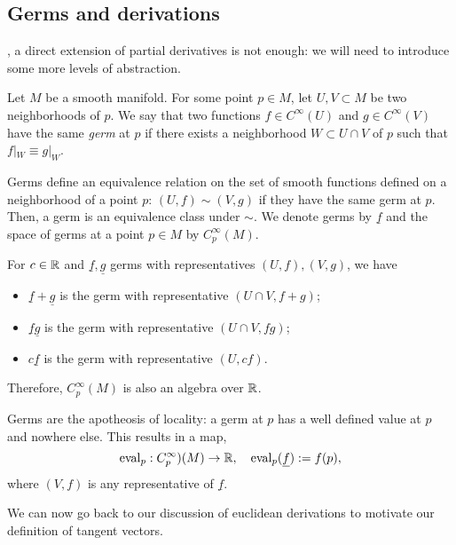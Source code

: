 \subsection{Germs and derivations}

, a direct extension of partial derivatives is not enough: we will need to introduce some more levels of abstraction.

\begin{defn}
    Let $M$ be a smooth manifold.
    For some point $p\in M$, let $U,V\subset M$ be two neighborhoods of $p$.
    We say that two functions $f\in C^\infty(U)$ and $g\in C^\infty(V)$ have the same \emph{germ} at $p$ if there exists a neighborhood $W\subset U\cap V$ of $p$ such that $f|_W \equiv g|_W$.
\end{defn}

Germs define an equivalence relation on the set of smooth functions defined on a neighborhood of a point $p$: $(U, f) \sim (V, g)$ if they have the same germ at $p$. Then, a germ is an equivalence class under $\sim$. We denote germs by $\underline f$ and the space of germs at a point $p\in M$ by $C_p^\infty(M)$.

For $c\in\mathbb{R}$ and $\underline f, \underline g$ germs with representatives $(U, f), (V, g)$, we have
\begin{itemize}
    \item $\underline f + \underline g$ is the germ with representative $(U\cap V, f+g)$;
    \item $\underline f \underline g$ is the germ with representative $(U\cap V, f g)$;
    \item $c\underline f$ is the germ with representative $(U, cf)$.
\end{itemize}
Therefore, $C_p^\infty(M)$ is also an algebra over $\mathbb{R}$.

Germs are the apotheosis of locality: a germ at $p$ has a well defined value at $p$ and nowhere else.
This results in a map,
\begin{equation}
    \operatorname{eval}_p: C_p^\infty)(M) \to \mathbb{R}, \quad
    \operatorname{eval}_p(\underline f) := f(p),
\end{equation}
where $(V,f)$ is any representative of $\underline f$.

We can now go back to our discussion of euclidean derivations to motivate our definition of tangent vectors.

